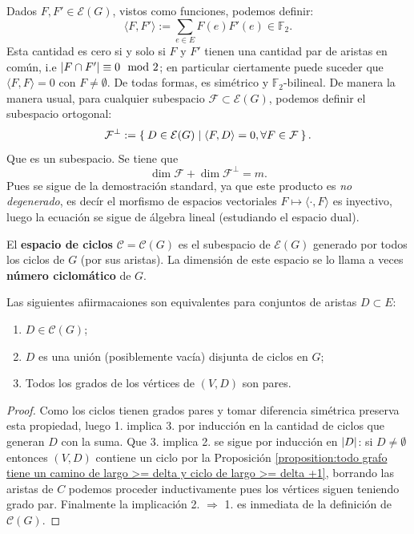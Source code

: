 \documentclass[../main.tex]{subfiles}
\begin{document}
Dados $F,F' \in \mathcal{E} (G)$, vistos como funciones, podemos definir:
\[
    \langle F, F' \rangle := \sum_{e \in E} F (e) F'(e) \in \mathbb{F}_2.
\]
Esta cantidad es cero si y solo si $F$ y $F'$ tienen una cantidad par de aristas en común, i.e $\left \vert F \cap F' \right \vert \equiv 0 \mod 2$; en particular ciertamente puede suceder que $\langle F , F \rangle = 0$ con $F \neq \emptyset$. De todas formas, es simétrico y $\mathbb{F}_2$-bilineal.
De manera la manera usual, para cualquier subespacio $\mathcal{F} \subset \mathcal{E}(G)$, podemos definir el subespacio ortogonal:
\[
    \mathcal{F}^\perp := \Set{D \in \mathcal{E}(G) | \langle F , D \rangle = 0, \\ \forall F \in \mathcal{F}}.
\]
Que es un subespacio. Se tiene que
$$
\dim \mathcal{F} + \dim \mathcal{F}^\perp = m.
$$
Pues se sigue de la demostración standard, ya que este producto es \textit{no degenerado}, es decír el morfismo de espacios vectoriales $F \mapsto \langle \cdot, F \rangle$ es inyectivo, luego la ecuación se sigue de álgebra lineal (estudiando el espacio dual).

\begin{definition}
El \textbf{espacio de ciclos} $\mathcal{C} = \mathcal{C}(G)$ es el subespacio de $\mathcal{E}(G)$ generado por todos los ciclos de $G$ (por sus aristas). La dimensión de este espacio se lo llama a veces \textbf{número ciclomático} de $G$.
\end{definition}

\begin{proposition}
Las siguientes afiirmacaiones son equivalentes para conjuntos de aristas $D \subset E$:
\begin{enumerate}[1.]
\item $D \in \mathcal{C} (G)$;
\item $D$ es una unión (posiblemente vacía) disjunta de ciclos en $G$;
\item Todos los grados de los vértices de $(V,D)$ son pares.
\end{enumerate}
\end{proposition}
\begin{proof}
Como los ciclos tienen grados pares y tomar diferencia simétrica preserva esta propiedad, luego 1. implica 3. por inducción en la cantidad de ciclos que generan $D$ con la suma. Que 3. implica 2. se sigue por inducción en $\left \vert D \right \vert$: si $D \neq \emptyset$ entonces $(V,D)$ contiene un ciclo por la Proposición \ref{proposition:todo grafo tiene un camino de largo >= delta y ciclo de largo >= delta +1}, borrando las aristas de $C$ podemos proceder inductivamente pues los vértices siguen teniendo grado par. Finalmente la implicación 2. $\Rightarrow$ 1. es inmediata de la definición de $\mathcal{C}(G)$.
\end{proof}
\end{document}
